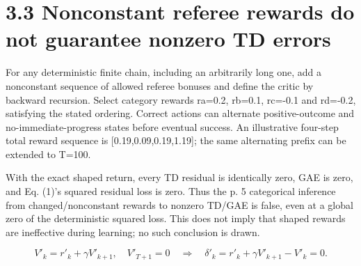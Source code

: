 \documentclass[10pt]{article}
\begin{document}
\section*{3.3 Nonconstant referee rewards do not guarantee nonzero TD errors}
For any deterministic finite chain, including an arbitrarily long one, add a nonconstant sequence of allowed referee bonuses and define the critic by backward recursion. Select category rewards ra=0.2, rb=0.1, rc=-0.1 and rd=-0.2, satisfying the stated ordering. Correct actions can alternate positive-outcome and no-immediate-progress states before eventual success. An illustrative four-step total reward sequence is [0.19,0.09,0.19,1.19]; the same alternating prefix can be extended to T=100.\par
With the exact shaped return, every TD residual is identically zero, GAE is zero, and Eq. (1)’s squared residual loss is zero. Thus the p. 5 categorical inference from changed/nonconstant rewards to nonzero TD/GAE is false, even at a global zero of the deterministic squared loss. This does not imply that shaped rewards are ineffective during learning; no such conclusion is drawn.\par
\[V'_k=r'_k+\gamma V'_{k+1},\quad V'_{T+1}=0\quad\Longrightarrow\quad \delta'_k=r'_k+\gamma V'_{k+1}-V'_k=0.\]\par
\end{document}
